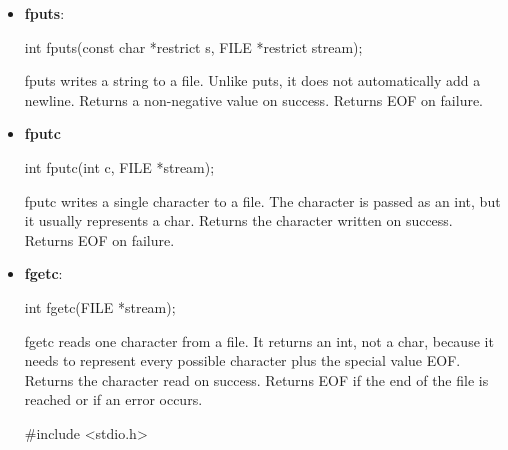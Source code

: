 \documentclass{report}
\begin{document}
\begin{itemize}
\begin{cppcode}
                int main(void) {
                    FILE *fp = fopen("numbers.txt", "w");

                    if (fp == NULL) {
                        perror("fopen");
                        return 1;
                    }

                    int x = 10;
                    double y = 3.14;

                    fprintf(fp, "x = %
                    fprintf(fp, "y = %

                    fclose(fp);
                    return 0;
                }
            \end{cppcode}
        \item \textbf{fputs}: 
            \bigbreak \noindent 
            \begin{cppcode}
                int fputs(const char *restrict s, FILE *restrict stream);
            \end{cppcode}
            \bigbreak \noindent 
            fputs writes a string to a file. Unlike puts, it does not automatically add a newline.
            \bigbreak \noindent 
            Returns a non-negative value on success. Returns EOF on failure.
        \item \textbf{fputc}
            \bigbreak \noindent 
            \begin{cppcode}
            int fputc(int c, FILE *stream);
            \end{cppcode}
            \bigbreak \noindent 
            fputc writes a single character to a file. The character is passed as an int, but it usually represents a char.
            \bigbreak \noindent 
            Returns the character written on success. Returns EOF on failure.
        \item \textbf{fgetc}: 
            \bigbreak \noindent 
            \begin{cppcode}
            int fgetc(FILE *stream);
            \end{cppcode}
            \bigbreak \noindent 
            fgetc reads one character from a file.
            \bigbreak \noindent 
            It returns an int, not a char, because it needs to represent every possible character plus the special value EOF.
            \bigbreak \noindent 
            Returns the character read on success. Returns EOF if the end of the file is reached or if an error occurs.
            \bigbreak \noindent 
            \begin{cppcode}
                #include <stdio.h>


\end{cppcode}
\end{itemize}
\end{document}
